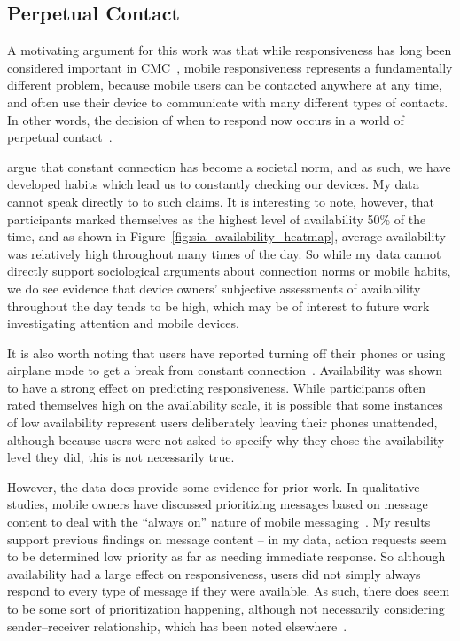 \documentclass[12pt]{nuthesis}	%
\begin{document}
\subsection{Perpetual Contact}

A motivating argument for this work was that while responsiveness has long been considered important in CMC~\citep[e.g.][]{avrahami2006responsiveness,dabbish2005understanding,kalman2006pauses,kalman2013online,tyler2003can,walther1995nonverbal}, mobile responsiveness represents a fundamentally different problem, because mobile users can be contacted anywhere at any time, and often use their device to communicate with many different types of contacts. In other words, the decision of when to respond now occurs in a world of perpetual contact~\citep{katz2002perpetual}.

\citet{bayer2015connection} argue that constant connection has become a societal norm, and as such, we have developed habits which lead us to constantly checking our devices. My data cannot speak directly to to such claims. It is interesting to note, however, that participants marked themselves as the highest level of availability 50\% of the time, and as shown in Figure~\ref{fig:sia_availability_heatmap}, average availability was relatively high throughout many times of the day. So while my data cannot directly support sociological arguments about connection norms or mobile habits, we do see evidence that device owners' subjective assessments of availability throughout the day tends to be high, which may be of interest to future work investigating attention and mobile devices.

It is also worth noting that users have reported turning off their phones or using airplane mode to get a break from constant connection~\citep{ames2013managing,smith2015us}. Availability was shown to have a strong effect on predicting responsiveness. While participants often rated themselves high on the availability scale, it is possible that some instances of low availability represent users deliberately leaving their phones unattended, although because users were not asked to specify why they chose the availability level they did, this is not necessarily true.

However, the data does provide some evidence for prior work. In qualitative studies, mobile owners have discussed prioritizing messages based on message content to deal with the ``always on'' nature of mobile messaging~\citep[e.g.,][]{cui2016beyond,wohn2015ambient}. My results support previous findings on message content -- in my data, action requests seem to be determined low priority as far as needing immediate response. So although availability had a large effect on responsiveness, users did not simply always respond to every type of message if they were available. As such, there does seem to be some sort of prioritization happening, although not necessarily considering sender--receiver relationship, which has been noted elsewhere~\citep{laursen2005please,wohn2015ambient}.
\end{document}
